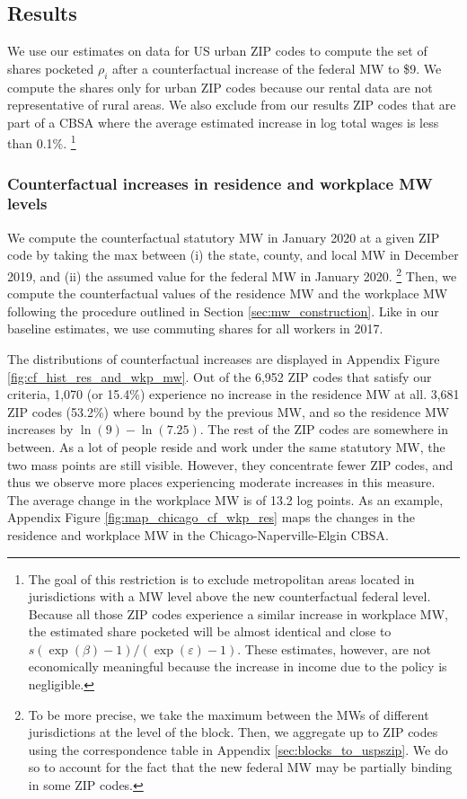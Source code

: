\subsection{Results}\label{sec:results_cf}

We use our estimates on data for US urban ZIP codes to compute the set of
shares pocketed ${\rho_i}$ after a counterfactual increase of the federal 
MW to \$9.
We compute the shares only for urban ZIP codes because our rental data are not 
representative of rural areas.
We also exclude from our results ZIP codes that are part of a CBSA where the
average estimated increase in log total wages is less than 0.1\%.%
\footnote{The goal of this restriction is to exclude metropolitan areas located 
in jurisdictions with a MW level above the new counterfactual federal level.
Because all those ZIP codes experience a similar increase in workplace MW,
the estimated share pocketed will be almost identical and close to 
$s \left(\exp(\beta)-1\right)/\left(\exp(\varepsilon)-1\right)$.
These estimates, however, are not economically meaningful because the increase
in income due to the policy is negligible.}

\subsubsection*{Counterfactual increases in residence and workplace MW levels}
\label{sec:cf_res_and_wkp_changes}

We compute the counterfactual statutory MW in January 2020 at a given ZIP code 
by taking the max between (i) the state, county, and local MW in December 2019, 
and (ii) the assumed value for the federal MW in January 2020.%
\footnote{To be more precise, we take the maximum between the MWs of different
jurisdictions at the level of the block.
Then, we aggregate up to ZIP codes using the correspondence table in Appendix 
\ref{sec:blocks_to_uspszip}.
We do so to account for the fact that the new federal MW may be partially binding
in some ZIP codes.}
Then, we compute the counterfactual values of the residence MW and the workplace
MW following the procedure outlined in Section \ref{sec:mw_construction}.
Like in our baseline estimates, we use commuting shares for all workers in
2017.

The distributions of counterfactual increases are displayed in Appendix
Figure \ref{fig:cf_hist_res_and_wkp_mw}.
Out of the 6,952 ZIP codes that satisfy our criteria, 1,070 (or 15.4\%) 
experience no increase in the residence MW at all.
3,681 ZIP codes (53.2\%) where bound by the previous MW, and so the residence MW
increases by $\ln(9)-\ln(7.25)$.
The rest of the ZIP codes are somewhere in between.
As a lot of people reside and work under the same statutory MW, the two mass
points are still visible.
However, they concentrate fewer ZIP codes, and thus we observe more places 
experiencing moderate increases in this measure.
The average change in the workplace MW is of 13.2 log points.
As an example, Appendix Figure \ref{fig:map_chicago_cf_wkp_res} maps the changes 
in the residence and workplace MW in the Chicago-Naperville-Elgin CBSA.

